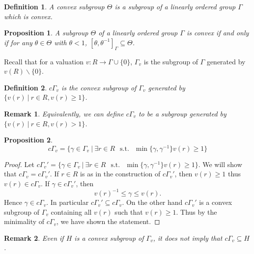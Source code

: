 \documentclass[8pt]{article}
\numberwithin{equation}{section}
\newtheorem{proposition}{Proposition}[subsection]
\newtheorem{definition}{Definition}[subsection]
\newtheorem{remark}{Remark}[subsection]
\DeclareMathOperator{\straw}{s.t.}
\newcommand{\sep}[0]{\:|\:}
\newcommand{\st}[0]{\:\straw\:}
\newcommand{\cGamma}[0]{c\Gamma}
\begin{document}
\begin{definition}
    A convex subgroup $\Theta$ is a subgroup of a linearly ordered group $\Gamma$ which is convex.
\end{definition}

\begin{proposition}
    \label{fact_6_8.5}
    A subgroup $\Theta$ of a linearly ordered group $\Gamma$ is convex if and only if for any $\theta\in \Theta$ with $\theta<1$, $[\theta,\theta^{-1}]_\Gamma\subseteq\Theta$.
\end{proposition}
Recall that for a valuation $v:R\to \Gamma\cup\{0\}$, $\Gamma_v$ is the subgroup of $\Gamma$ generated by $v(R)\backslash\{0\}$.
\begin{definition}
    \label{definition_6_9}
    $\cGamma_v$ is the convex subgroup of $\Gamma_v$ generated by $\{v(r)\sep r\in R, v(r)\geq1\}$. 
\end{definition}
\begin{remark}
    Equivalently, we can define $\cGamma_v$ to be a subgroup generated by $\{v(r)\sep r\in R, v(r)>1\}$.
\end{remark}

\begin{proposition}
    \label{fact_6_10}
    \begin{equation*}
        \cGamma_v = \{\gamma\in\Gamma_v\sep \exists r\in R \:\st\: \min\{\gamma,\gamma^{-1}\} v(r)\geq1\}
    \end{equation*}
\end{proposition}
\begin{proof}
    Let $\cGamma_v' =  \{\gamma\in\Gamma_v\sep \exists r\in R \:\st\: \min\{\gamma,\gamma^{-1}\} v(r)\geq1\}$. We will show that $\cGamma_v=\cGamma_v'$.
    If $r\in R$ is as in the construction of $\cGamma_v'$, then $v(r)\geq1$ thus $v(r)\in\cGamma_v$. If $\gamma\in\cGamma_v'$, then 
    \begin{equation*}
        v(r)^{-1}\leq \gamma\leq v(r).
    \end{equation*}
    Hence $\gamma\in\cGamma_v$. In particular $\cGamma_v'\subseteq\cGamma_v$. On the other hand $\cGamma_v'$ is a convex subgroup of $\Gamma_v$ containing all $v(r)$ such that $v(r)\geq1$. Thus by the minimality of $\cGamma_v$, we have shown the statement.
\end{proof}
\begin{remark}
    Even if $H$ is a convex subgroup of $\Gamma_v$, it does not imply that $\cGamma_v\subseteq H$.
\end{remark}
\end{document}
